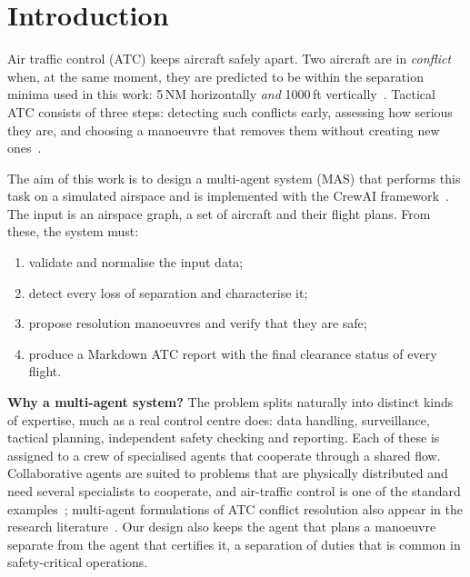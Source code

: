 \section{Introduction}\label{sec:intro}

Air traffic control (ATC) keeps aircraft safely apart. Two aircraft are in \emph{conflict} when, at the same moment, they are predicted to be within the separation minima used in this work: 5\,NM horizontally \emph{and} 1000\,ft vertically~\cite{icao4444}. Tactical ATC consists of three steps: detecting such conflicts early, assessing how serious they are, and choosing a manoeuvre that removes them without creating new ones~\cite{kuchar2000}.

The aim of this work is to design a multi-agent system (MAS) that performs this task on a simulated airspace and is implemented with the CrewAI framework~\cite{crewai}. The input is an airspace graph, a set of aircraft and their flight plans. From these, the system must:
\begin{enumerate}
    \item validate and normalise the input data;
    \item detect every loss of separation and characterise it;
    \item propose resolution manoeuvres and verify that they are safe;
    \item produce a Markdown ATC report with the final clearance status of every flight.
\end{enumerate}

\textbf{Why a multi-agent system?} The problem splits naturally into distinct kinds of expertise, much as a real control centre does: data handling, surveillance, tactical planning, independent safety checking and reporting. Each of these is assigned to a crew of specialised agents that cooperate through a shared flow. Collaborative agents are suited to problems that are physically distributed and need several specialists to cooperate, and air-traffic control is one of the standard examples~\cite{urvlect3}; multi-agent formulations of ATC conflict resolution also appear in the research literature~\cite{tomlin1998}. Our design also keeps the agent that plans a manoeuvre separate from the agent that certifies it, a separation of duties that is common in safety-critical operations.

